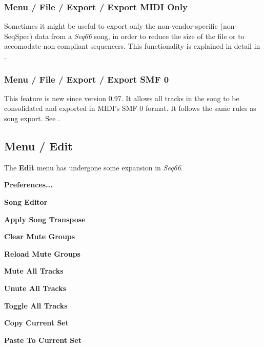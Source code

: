 \subsubsection{Menu / File / Export / Export MIDI Only}
\label{subsubsec:menu_file_export_midi_only}

   Sometimes it might be useful to export only the non-vendor-specific
   (non-SeqSpec) data from a \textsl{Seq66} song, in order to reduce the
   size of the file or to accomodate non-compliant sequencers.
   This functionality is explained in detail in
   .

\subsubsection{Menu / File / Export / Export SMF 0}
\label{subsubsec:menu_file_export_smf_0}

   This feature is new since version 0.97.  It allows all tracks in the song to
   be consolidated and exported in MIDI's SMF 0 format.  It follows the same
   rules as song export.
   See .

\subsection{Menu / Edit}
\label{subsec:menu_edit}

   The \textbf{Edit} menu has undergone some expansion in \textsl{Seq66}.

   \begin{enumber}
      \item \textbf{Preferences...}
      \item \textbf{Song Editor}
      \item \textbf{Apply Song Transpose}
      \item \textbf{Clear Mute Groups}
      \item \textbf{Reload Mute Groups}
      \item \textbf{Mute All Tracks}
      \item \textbf{Unute All Tracks}
      \item \textbf{Toggle All Tracks}
      \item \textbf{Copy Current Set}
      \item \textbf{Paste To Current Set}
   \end{enumber}

   \setcounter{ItemCounter}{0}      %

